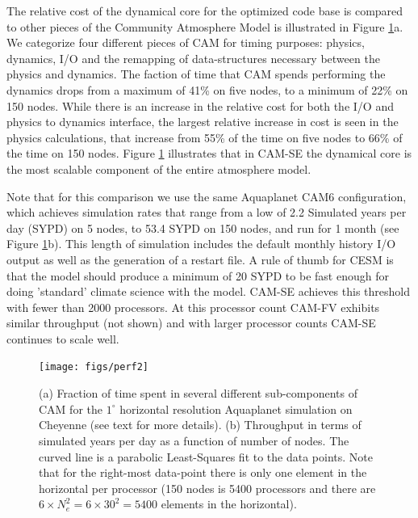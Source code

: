 \documentclass{agujournal}
\begin{document}
{The relative cost of the dynamical core for the optimized code base is compared to other pieces of the Community Atmosphere Model is illustrated in Figure \ref{fig:percent}a. We categorize four different pieces of CAM for timing purposes: physics, dynamics, I/O and the remapping of data-structures necessary between the physics and dynamics.  The faction of time that CAM spends performing the dynamics drops from a maximum of 41\% on five nodes, to a minimum of 22\% on 150 nodes.  While there is an increase in the relative cost for both the I/O and physics to dynamics interface, the largest relative increase in cost is seen in the physics calculations, that increase from 55\% of the time on five nodes to 66\% of the time on 150 nodes.  Figure \ref{fig:percent} illustrates that in CAM-SE the dynamical core is the most scalable component of the entire atmosphere model.  

Note that for this comparison we use the same Aquaplanet CAM6 configuration, which achieves simulation rates that range from a low of 2.2 Simulated years per day (SYPD) on 5 nodes, to 53.4 SYPD on 150 nodes, and run for 1 month (see Figure \ref{fig:percent}b). This length of simulation includes the default monthly history I/O output as well as the generation of a restart file. A rule of thumb for CESM is that the model should produce a minimum of 20 SYPD to be fast enough for doing 'standard' climate science with the model. CAM-SE achieves this threshold with fewer than 2000 processors. At this processor count CAM-FV exhibits similar throughput (not shown) and with larger processor counts CAM-SE continues to scale well.

\begin{figure}[h]
\centering
 \texttt{[image: figs/perf2]}
 \caption{(a) Fraction of time spent in several different sub-components of CAM for the $1^\circ$ horizontal resolution Aquaplanet simulation on Cheyenne (see text for more details). (b) Throughput in terms of simulated years per day as a function of number of nodes. The curved line is a parabolic Least-Squares fit to the data points. Note that for the right-most data-point there is only one element in the horizontal per processor (150 nodes is 5400 processors and there are $6\times N_e^2=6\times 30^2=5400$ elements in the horizontal).}
 \label{fig:percent}
\end{figure}



}
\end{document}
